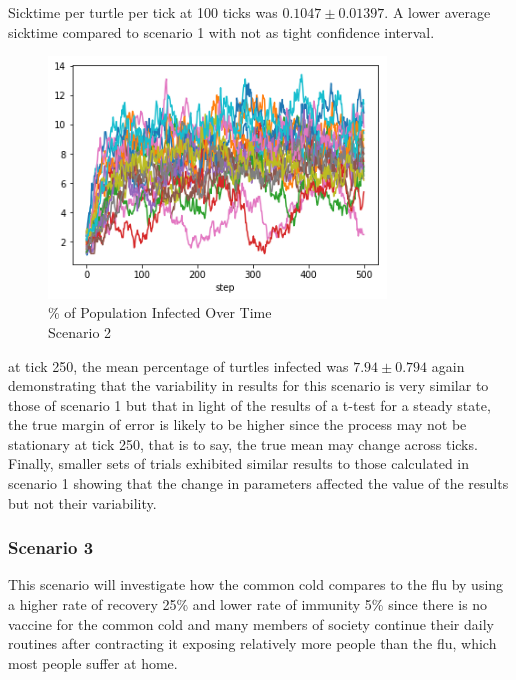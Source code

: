 \documentclass[11pt]{article} %
\begin{document}
Sicktime per turtle per tick at 100 ticks was $ 0.1047 \pm 0.01397$. A lower average sicktime compared to scenario 1 with not as tight confidence interval. 

\begin{figure}
\centering
\includegraphics[width=0.8\textwidth]{20-runs-scenario-2-steady-state}
\caption{\% of Population Infected Over Time \\ Scenario 2}
\end{figure}



at tick 250, the mean percentage of turtles infected was $7.94 \pm 0.794$ again demonstrating that the variability in results for this scenario is very similar to those of scenario 1 but that in light of the results of a t-test for a steady state, the true margin of error is likely to be higher since the process may not be stationary at tick 250, that is to say, the true mean may change across ticks.  Finally, smaller sets of trials exhibited similar results to those calculated in scenario 1 showing that the change in parameters affected the value of the results but not their variability. 

\subsubsection{Scenario 3}


This scenario will investigate how the common cold compares to the flu by using a higher rate of recovery 25\% and lower rate of immunity 5\% since there is no vaccine for the common cold and many members of society continue their daily routines after contracting it exposing relatively more people than the flu, which most people suffer at home. 
\end{document}
